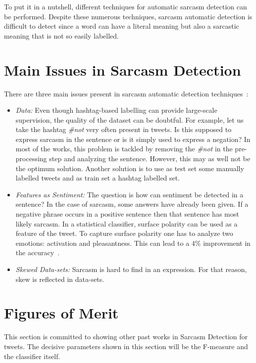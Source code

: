To put it in a nutshell, different techniques for automatic sarcasm detection can be performed. Despite these numerous techniques, sarcasm automatic detection is difficult to detect since a word can have a literal meaning but also a sarcastic meaning that is not so easily labelled.

\section{Main Issues in Sarcasm Detection}
There are three main issues present in sarcasm automatic detection techniques~\cite{joshi2017automatic}:
\begin{itemize}
	\item \textit{Data:} Even though hashtag-based labelling can provide large-scale supervision, the quality of the dataset can be doubtful. For example, let us take the hashtag \textit{\#not} very often present in tweets. Is this supposed to express sarcasm in the sentence or is it simply used to express a negation? In most of the works, this problem is tackled by removing the \textit{\#not} in the pre-processing step and analyzing the sentence. However, this may as well not be the optimum solution. Another solution is to use as test set some manually labelled tweets and as train set a hashtag labelled set. 
	\item \textit{Features as Sentiment:} The question is how can sentiment be detected in a sentence? In the case of sarcasm, some answers have already been given. If a negative phrase occurs in a positive sentence then that sentence has most likely sarcasm. In a statistical classifier, surface polarity can be used as a feature of the tweet. To capture surface polarity one has to analyze two emotions: activation and pleasantness. This can lead to a $4\%$ improvement in the accuracy~\cite{joshi2017automatic}.
	\item \textit{Skewed Data-sets: }
	Sarcasm is hard to find in an expression. For that reason, skew is reflected in data-sets.
\end{itemize}

\section{Figures of Merit}
This section is committed to showing other past works in Sarcasm Detection for tweets. The decisive parameters shown in this section will be the F-measure and the classifier itself.

